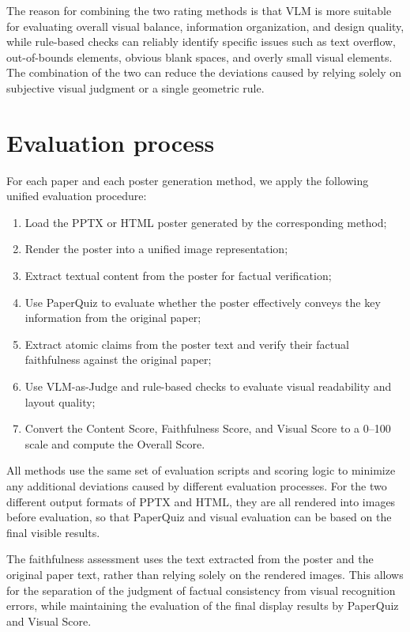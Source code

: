 \documentclass[12pt,oneside]{report}
\begin{document}
The reason for combining the two rating methods is that VLM is more suitable for evaluating overall visual balance, information organization, and design quality, while rule-based checks can reliably identify specific issues such as text overflow, out-of-bounds elements, obvious blank spaces, and overly small visual elements. The combination of the two can reduce the deviations caused by relying solely on subjective visual judgment or a single geometric rule.

\section{Evaluation process}

For each paper and each poster generation method, we apply the following unified evaluation procedure:

\begin{enumerate}
    \item Load the PPTX or HTML poster generated by the corresponding method;
    \item Render the poster into a unified image representation;
    \item Extract textual content from the poster for factual verification;
    \item Use PaperQuiz to evaluate whether the poster effectively conveys the key information from the original paper;
    \item Extract atomic claims from the poster text and verify their factual faithfulness against the original paper;
    \item Use VLM-as-Judge and rule-based checks to evaluate visual readability and layout quality;
    \item Convert the Content Score, Faithfulness Score, and Visual Score to a 0--100 scale and compute the Overall Score.
\end{enumerate}

All methods use the same set of evaluation scripts and scoring logic to minimize any additional deviations caused by different evaluation processes. For the two different output formats of PPTX and HTML, they are all rendered into images before evaluation, so that PaperQuiz and visual evaluation can be based on the final visible results.

\vspace{1em}

The faithfulness assessment uses the text extracted from the poster and the original paper text, rather than relying solely on the rendered images. This allows for the separation of the judgment of factual consistency from visual recognition errors, while maintaining the evaluation of the final display results by PaperQuiz and Visual Score.
\end{document}
